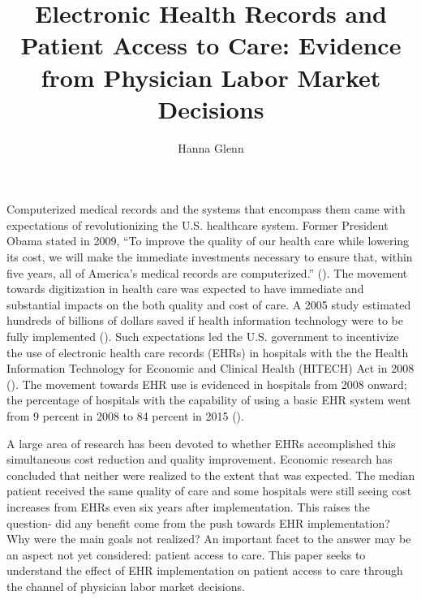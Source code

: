 \documentclass[11pt]{article}
\title{Electronic Health Records and Patient Access to Care: Evidence from Physician Labor Market Decisions}
\author{Hanna Glenn}
\begin{document}
\maketitle

Computerized medical records and the systems that encompass them came with expectations of revolutionizing the U.S. healthcare system. Former President Obama stated in 2009, “To improve the quality of our health care while lowering its cost, we will make the immediate investments necessary to ensure that, within five years, all of America’s medical records are computerized.” (\cite{presquote}). The movement towards digitization in health care was expected to have immediate and substantial impacts on the both quality and cost of care. A 2005 study estimated hundreds of billions of dollars saved if health information technology were to be fully implemented (\cite{hillestad2005}). Such expectations led the U.S. government to incentivize the use of electronic health care records (EHRs) in hospitals with the the Health Information Technology for Economic and Clinical Health (HITECH) Act in 2008 (\cite{hitech}). The movement towards EHR use is evidenced in hospitals from 2008 onward; the percentage of hospitals with the capability of using a basic EHR system went from 9 percent in 2008 to 84 percent in 2015 (\cite{stats}).

A large area of research has been devoted to whether EHRs accomplished this simultaneous cost reduction and quality improvement. Economic research has concluded that neither were realized to the extent that was expected. The median patient received the same quality of care and some hospitals were still seeing cost increases from EHRs even six years after implementation. This raises the question- did any benefit come from the push towards EHR implementation? Why were the main goals not realized? An important facet to the answer may be an aspect not yet considered: patient access to care. This paper seeks to understand the effect of EHR implementation on patient access to care through the channel of physician labor market decisions. 
\end{document}
